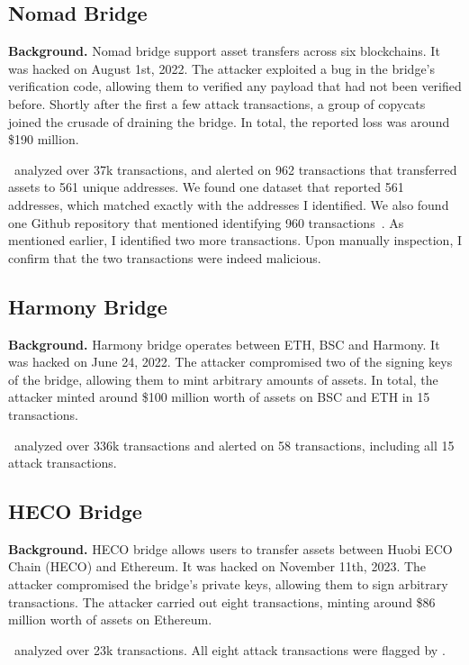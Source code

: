 \subsection{Nomad Bridge}
\textbf{Background.} Nomad bridge support asset transfers across six blockchains. It was hacked on August 1st, 2022. The attacker exploited a bug in the bridge's verification code, allowing them to verified any payload that had not been verified before. Shortly after the first a few attack transactions, a group of copycats joined the crusade of draining the bridge. In total, the reported loss was around \$190 million.

 \offlinetool~analyzed over 37k transactions, and alerted on 962 transactions that transferred assets to 561 unique addresses. We found one dataset that reported 561 addresses, which matched exactly with the addresses I identified. We also found one Github repository that mentioned identifying 960 transactions~\cite{nomad-groundtruth-github:online}. As mentioned earlier, I identified two more transactions. Upon manually inspection, I confirm that the two transactions were indeed malicious.

\subsection{Harmony Bridge}
\textbf{Background.} Harmony bridge operates between ETH, BSC and Harmony. It was hacked on June 24, 2022. The attacker compromised two of the signing keys of the bridge, allowing them to mint arbitrary amounts of assets. In total, the attacker minted around \$100 million worth of assets on BSC and ETH in 15 transactions.

 \offlinetool~analyzed over 336k transactions and alerted on 58 transactions, including all 15 attack transactions. 


\subsection{HECO Bridge}
\textbf{Background.} HECO bridge allows users to transfer assets between Huobi ECO Chain (HECO) and Ethereum. It was hacked on November 11th, 2023. The attacker compromised the bridge's private keys, allowing them to sign arbitrary transactions. The attacker carried out eight transactions, minting around \$86 million worth of assets on Ethereum.

 \offlinetool~analyzed over 23k transactions. All eight attack transactions were flagged by \offlinetool.

